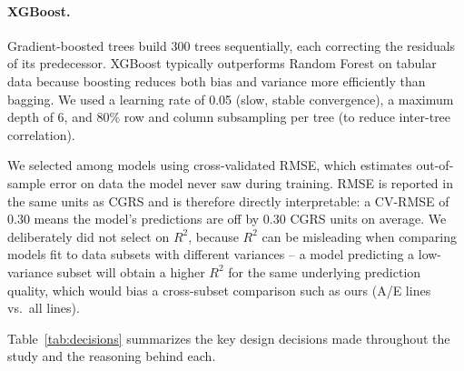 \documentclass[11pt]{article}
\begin{document}
\paragraph{XGBoost.} Gradient-boosted trees build 300 trees sequentially, each correcting the residuals of its predecessor. XGBoost typically outperforms Random Forest on tabular data because boosting reduces both bias and variance more efficiently than bagging. We used a learning rate of 0.05 (slow, stable convergence), a maximum depth of 6, and 80\% row and column subsampling per tree (to reduce inter-tree correlation).

We selected among models using cross-validated RMSE, which estimates out-of-sample error on data the model never saw during training. RMSE is reported in the same units as CGRS and is therefore directly interpretable: a CV-RMSE of 0.30 means the model's predictions are off by 0.30 CGRS units on average. We deliberately did not select on $R^2$, because $R^2$ can be misleading when comparing models fit to data subsets with different variances -- a model predicting a low-variance subset will obtain a higher $R^2$ for the same underlying prediction quality, which would bias a cross-subset comparison such as ours (A/E lines vs.\ all lines).

Table~\ref{tab:decisions} summarizes the key design decisions made throughout the study and the reasoning behind each.
\end{document}
